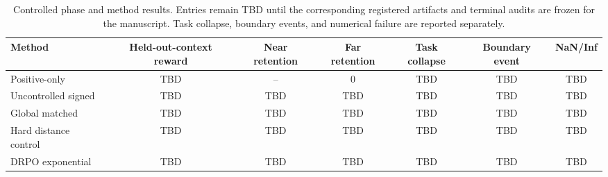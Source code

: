 \begin{table}[t]
\centering
\caption{Controlled phase and method results. Entries remain TBD until the corresponding registered artifacts and terminal audits are frozen for the manuscript. Task collapse, boundary events, and numerical failure are reported separately.}
\label{tab:controlled_results}
\small
\begin{tabular}{lcccccc}
\toprule
Method & Held-out-context reward & Near retention & Far retention & Task collapse & Boundary event & NaN/Inf \\
\midrule
Positive-only & TBD & -- & 0 & TBD & TBD & TBD \\
Uncontrolled signed & TBD & TBD & TBD & TBD & TBD & TBD \\
Global matched & TBD & TBD & TBD & TBD & TBD & TBD \\
Hard distance control & TBD & TBD & TBD & TBD & TBD & TBD \\
DRPO exponential & TBD & TBD & TBD & TBD & TBD & TBD \\
\bottomrule
\end{tabular}
\end{table}
